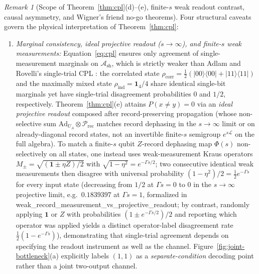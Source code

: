 \documentclass[11pt,a4paper]{article}
\theoremstyle{definition}
\theoremstyle{remark}
\newtheorem{remark}{Remark}
\newcommand{\cA}{\mathcal{A}}
\newcommand{\cL}{\mathcal{L}}
\newcommand{\cP}{\mathcal{P}}
\newcommand{\1}{\mathbf{1}}
\newcommand{\code}[1]{{\footnotesize\ttfamily #1}}
\begin{document}
\begin{remark}[Scope of Theorem~\ref{thm:cpl}(d)--(e), finite-$s$ weak readout contrast, causal asymmetry, and Wigner's friend no-go theorems]\label{rem:cpl-wigner}
Four structural caveats govern the physical interpretation of Theorem~\ref{thm:cpl}:
\begin{enumerate}
  \item \emph{Marginal consistency, ideal projective readout ($s\to\infty$), and finite-$s$ weak measurements:} Equation~\eqref{eq:cpl} ensures only agreement of single-measurement marginals on $\cA_{\mathrm{sh}}$, which is strictly weaker than Adlam and Rovelli's single-trial CPL \cite[Def.~4.1]{AdlamRovelli2022}: the correlated state $\rho_{\mathrm{corr}} = \frac{1}{2}(|00\rangle\langle 00| + |11\rangle\langle 11|)$ and the maximally mixed state $\rho_{\mathrm{ind}} = \1_4/4$ share identical single-bit marginals yet have single-trial disagreement probabilities $0$ and $1/2$, respectively. Theorem~\ref{thm:cpl}(e) attains $P(x\neq y)=0$ via an \emph{ideal projective readout} composed after record-preserving propagation (whose non-selective sum $\mathrm{Ad}_{U_A}\otimes\cP_{\mathrm{rec}}$ matches record dephasing in the $s\to\infty$ limit or on already-diagonal record states, not an invertible finite-$s$ semigroup $e^{s\cL}$ on the full algebra). To match a finite-$s$ qubit $Z$-record dephasing map $\Phi(s)$ non-selectively on all states, one instead uses weak-measurement Kraus operators $M_\pm = \sqrt{(\1\pm\eta Z)/2}$ with $\sqrt{1-\eta^2} = e^{-\Gamma s/2}$; two consecutive identical weak measurements then disagree with universal probability $(1-\eta^2)/2 = \frac{1}{2}e^{-\Gamma s}$ for every input state (decreasing from $1/2$ at $\Gamma s=0$ to $0$ in the $s\to\infty$ projective limit, e.g.\ $0.1839397$ at $\Gamma s = 1$, formalized in \code{weak\_\allowbreak record\_\allowbreak measurement\_\allowbreak vs\_\allowbreak projective\_\allowbreak readout}; by contrast, randomly applying $\1$ or $Z$ with probabilities $(1\pm e^{-\Gamma s/2})/2$ and reporting which operator was applied yields a distinct operator-label disagreement rate $\frac{1}{2}(1-e^{-\Gamma s})$), demonstrating that single-trial agreement depends on specifying the readout instrument as well as the channel. Figure~\ref{fig:joint-bottleneck}(a) explicitly labels $(1,1)$ as a \emph{separate-condition} decoding point rather than a joint two-output channel.

\end{enumerate}
\end{remark}
\end{document}
